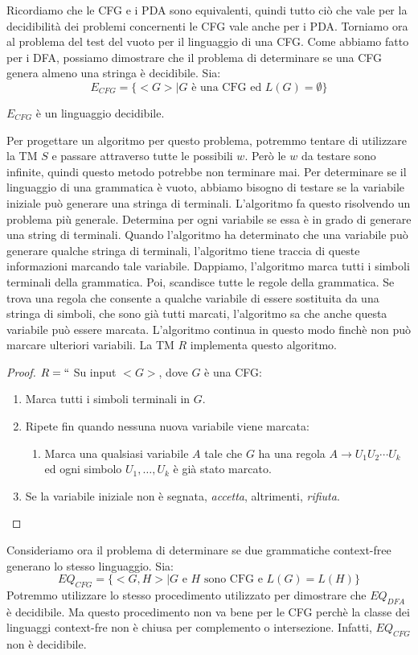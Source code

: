 \documentclass[12pt]{report}
\newcounter{theorem}
\begin{document}
Ricordiamo che le CFG e i PDA sono equivalenti, quindi tutto ciò che vale per la decidibilità dei problemi concernenti le CFG vale anche per i PDA. Torniamo ora al problema del test del vuoto per il linguaggio di una CFG. Come abbiamo fatto per i DFA, possiamo dimostrare che il problema di determinare se una CFG genera almeno una stringa è decidibile. Sia:
\[
E_{CFG} = \{<G> \mid G \text{ è una CFG ed }L(G) = \emptyset\}
\]
\begin{theorem}{}{}
	$E_{CFG}$ è un linguaggio decidibile.
\end{theorem}
Per progettare un algoritmo per questo problema, potremmo tentare di utilizzare la TM $S$ e passare attraverso tutte le possibili $w$. Però le $w$ da testare sono infinite, quindi questo metodo potrebbe non terminare mai. Per determinare se il linguaggio di una grammatica è vuoto, abbiamo bisogno di testare se la variabile iniziale può generare una stringa di terminali. L'algoritmo fa questo risolvendo un problema più generale. Determina per ogni variabile se essa è in grado di generare una string di terminali. Quando l'algoritmo ha determinato che una variabile può generare qualche stringa di terminali, l'algoritmo tiene traccia di queste informazioni marcando tale variabile. Dappiamo, l'algoritmo marca tutti i simboli terminali della grammatica. Poi, scandisce tutte le regole della grammatica. Se trova una regola che consente a qualche variabile di essere sostituita da una stringa di simboli, che sono già tutti marcati, l'algoritmo sa che anche questa variabile può essere marcata. L'algoritmo continua in questo modo finchè non può marcare ulteriori variabili. La TM $R$ implementa questo algoritmo.
\begin{proof}
$R = ``$ Su input $<G>$, dove $G$ è una CFG:
\begin{enumerate}
	\item Marca tutti i simboli terminali in $G$.
	\item Ripete fin quando nessuna nuova variabile viene marcata:
	\begin{enumerate}
		\item Marca una qualsiasi variabile $A$ tale che $G$ ha una regola $A \to U_1U_2\cdots U_k$ ed ogni simbolo $U_1, \dots, U_k$ è già stato marcato.
	\end{enumerate}
	\item Se la variabile iniziale non è segnata, \textit{accetta}, altrimenti, \textit{rifiuta}.
\end{enumerate}
\end{proof}
Consideriamo ora il problema di determinare se due grammatiche context-free generano lo stesso linguaggio. Sia:
\[
EQ_{CFG} = \{<G, H> \mid G \text{ e }H \text{ sono CFG e } L(G) = L(H)\}
\]
Potremmo utilizzare lo stesso procedimento utilizzato per dimostrare che  $EQ_{DFA}$ è decidibile. Ma questo procedimento non va bene per le CFG perchè la classe dei linguaggi context-fre non è chiusa per complemento o intersezione. Infatti, $EQ_{CFG}$ non è decidibile.
\end{document}
